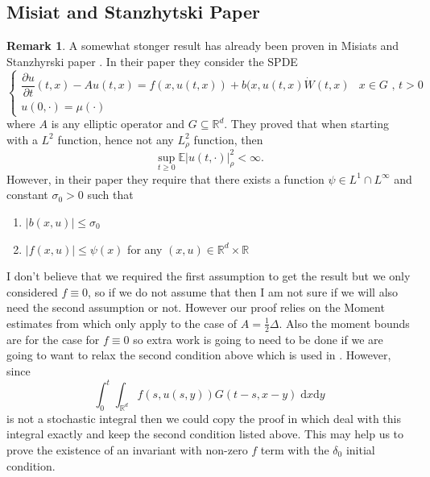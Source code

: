 \documentclass[a4paper,11pt]{article}
\theoremstyle{plain}
\theoremstyle{definition}
\newtheorem{remark}[theorem]{Remark}
\newcommand{\E}{\mathbb{E}}
\newcommand{\ud}{\ensuremath{\mathrm{d}}}
\newcommand{\R}{\mathbb{R}}
\numberwithin{NQ}{section}
\numberwithin{LQ}{section}
\numberwithin{ZQ}{section}
\begin{document}
\subsection{Misiat and Stanzhytski Paper}

\begin{remark}
A somewhat stonger result has already been proven in Misiats and Stanzhyrski paper \cite{MSY16}. In their paper they consider the SPDE 
$$ \begin{cases}
 \dfrac{\partial u}{\partial t}(t,x)- Au(t,x) = f(x,u(t,x)) + b(x,u(t,x)\dot W(t,x) & \text{$x\in G$ , $t>0$}
 \\ u(0,\cdot) = \mu(\cdot)  & 
 \end{cases} $$
 where $A$ is any elliptic operator and $G\subseteq \R^d$. They proved that when starting with a $L^2$ function, hence not any $L^2_\rho$ function, then 
 $$ \sup_{t\ge 0} \E |u(t,\cdot)|_\rho^2 < \infty. $$ However, in their paper they require that there exists a function $\psi \in L^1 \cap L^\infty$ and constant $\sigma_0 >0$ such that 
 \begin{enumerate}
     \item $|b(x,u)|\le \sigma_0$
     \item $|f(x,u)|\le \psi(x)$ for any $(x,u) \in \R^d \times \R$
 \end{enumerate}
 I don't believe that we required the first assumption to get the result but we only considered $f \equiv 0$, so if we do not assume that then I am not sure if we will also need the second assumption or not. However our proof relies on the Moment estimates from \cite{CH16Comparison} which only apply to the case of $A=\frac{1}{2}\Delta$. Also the moment bounds are for the case for $f \equiv 0$ so extra work is going to need to be done if we are going to want to relax the second condition above which is used in \cite{MSY16}. However, since 
 $$ \int_0^t\int_{\R^d} f(s,u(s,y))G(t-s,x-y)\;\ud x \ud y $$
 is not a stochastic integral then we could copy the proof in \cite{MSY16} which deal with this integral exactly and keep the second condition listed above. This may help us to prove the existence of an invariant with non-zero $f$ term with the $\delta_0$ initial condition. 
\end{remark}
\end{document}
